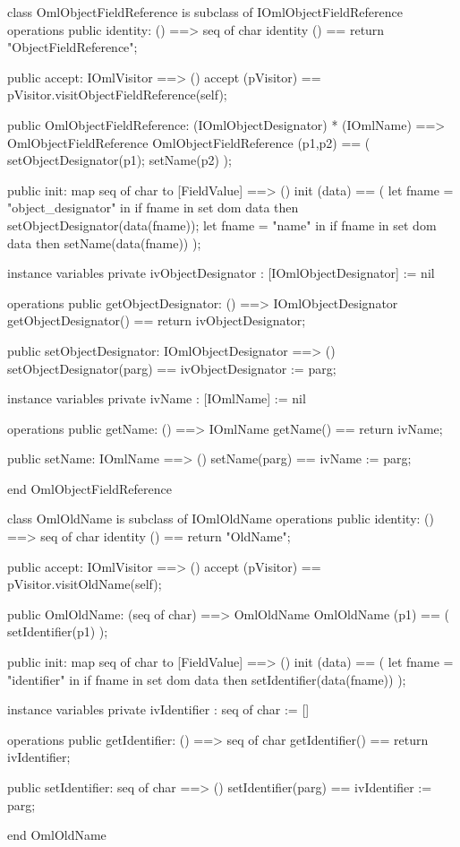 \begin{vdm_al}
class OmlObjectFieldReference is subclass of IOmlObjectFieldReference
operations
  public identity: () ==> seq of char
  identity () == return "ObjectFieldReference";

  public accept: IOmlVisitor ==> ()
  accept (pVisitor) == pVisitor.visitObjectFieldReference(self);

  public OmlObjectFieldReference:
      (IOmlObjectDesignator) *
      (IOmlName) ==> OmlObjectFieldReference
  OmlObjectFieldReference (p1,p2) == 
   ( setObjectDesignator(p1);
     setName(p2) );

  public init: map seq of char to [FieldValue] ==> ()
  init (data) ==
    ( let fname = "object_designator" in
        if fname in set dom data
        then setObjectDesignator(data(fname));
      let fname = "name" in
        if fname in set dom data
        then setName(data(fname)) );

instance variables
  private ivObjectDesignator : [IOmlObjectDesignator] := nil

operations
  public getObjectDesignator: () ==> IOmlObjectDesignator
  getObjectDesignator() == return ivObjectDesignator;

  public setObjectDesignator: IOmlObjectDesignator ==> ()
  setObjectDesignator(parg) == ivObjectDesignator := parg;

instance variables
  private ivName : [IOmlName] := nil

operations
  public getName: () ==> IOmlName
  getName() == return ivName;

  public setName: IOmlName ==> ()
  setName(parg) == ivName := parg;

end OmlObjectFieldReference
\end{vdm_al}

\begin{vdm_al}
class OmlOldName is subclass of IOmlOldName
operations
  public identity: () ==> seq of char
  identity () == return "OldName";

  public accept: IOmlVisitor ==> ()
  accept (pVisitor) == pVisitor.visitOldName(self);

  public OmlOldName:
      (seq of char) ==> OmlOldName
  OmlOldName (p1) == 
   ( setIdentifier(p1) );

  public init: map seq of char to [FieldValue] ==> ()
  init (data) ==
    ( let fname = "identifier" in
        if fname in set dom data
        then setIdentifier(data(fname)) );

instance variables
  private ivIdentifier : seq of char := []

operations
  public getIdentifier: () ==> seq of char
  getIdentifier() == return ivIdentifier;

  public setIdentifier: seq of char ==> ()
  setIdentifier(parg) == ivIdentifier := parg;

end OmlOldName
\end{vdm_al}

